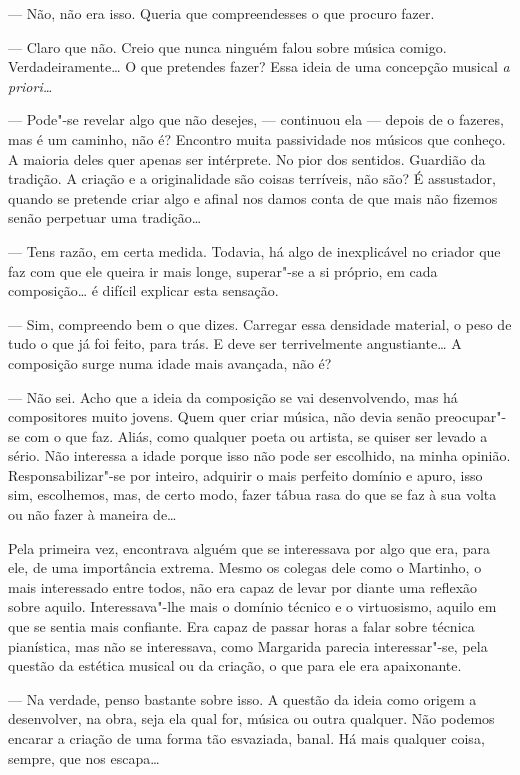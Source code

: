 --- Não, não era isso. Queria que compreendesses o que procuro fazer.

--- Claro que não. Creio que nunca ninguém falou sobre música comigo.
Verdadeiramente\ldots{} O que pretendes fazer? Essa ideia de uma concepção
musical \emph{a priori\ldots{}}

--- Pode"-se revelar algo que não desejes, --- continuou ela --- depois
de o fazeres, mas é um caminho, não é? Encontro muita passividade nos
músicos que conheço. A maioria deles quer apenas ser intérprete. No pior
dos sentidos. Guardião da tradição. A criação e a originalidade são
coisas terríveis, não são? É assustador, quando se pretende criar algo e
afinal nos damos conta de que mais não fizemos senão perpetuar uma
tradição\ldots{}

--- Tens razão, em certa medida. Todavia, há algo de inexplicável no
criador que faz com que ele queira ir mais longe, superar"-se a si
próprio, em cada composição\ldots{} é difícil explicar esta sensação.

--- Sim, compreendo bem o que dizes. Carregar essa densidade material, o
peso de tudo o que já foi feito, para trás. E deve ser terrivelmente
angustiante\ldots{} A composição surge numa idade mais avançada, não é?

--- Não sei. Acho que a ideia da composição se vai desenvolvendo, mas há
compositores muito jovens. Quem quer criar música, não devia senão
preocupar"-se com o que faz. Aliás, como qualquer poeta ou artista, se
quiser ser levado a sério. Não interessa a idade porque isso não pode
ser escolhido, na minha opinião. Responsabilizar"-se por inteiro,
adquirir o mais perfeito domínio e apuro, isso sim, escolhemos, mas, de
certo modo, fazer tábua rasa do que se faz à sua volta ou não fazer à
maneira de\ldots{}

Pela primeira vez, encontrava alguém que se interessava por algo que
era, para ele, de uma importância extrema. Mesmo os colegas dele como o
Martinho, o mais interessado entre todos, não era capaz de levar por
diante uma reflexão sobre aquilo. Interessava"-lhe mais o domínio técnico
e o virtuosismo, aquilo em que se sentia mais confiante. Era capaz de
passar horas a falar sobre técnica pianística, mas não se interessava,
como Margarida parecia interessar"-se, pela questão da estética musical
ou da criação, o que para ele era apaixonante.

--- Na verdade, penso bastante sobre isso. A questão da ideia como origem
a desenvolver, na obra, seja ela qual for, música ou outra qualquer. Não
podemos encarar a criação de uma forma tão esvaziada, banal. Há mais
qualquer coisa, sempre, que nos escapa\ldots{}

